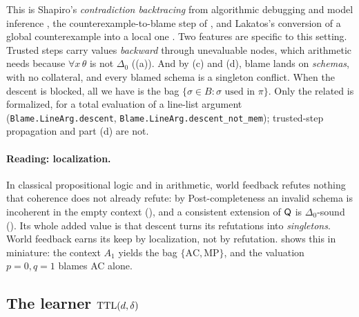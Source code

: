 This is Shapiro's \emph{contradiction backtracing} from algorithmic debugging and model inference \citep{shapiro1981inductive,shapiro1983algorithmic}, the counterexample-to-blame step of , and Lakatos's conversion of a global counterexample into a local one \citep{lakatos1976proofs}. Two features are specific to this setting. Trusted steps carry values \emph{backward} through unevaluable nodes, which arithmetic needs because $\forall x\,\theta$ is not $\Delta_0$ ((a)). And by (c) and (d), blame lands on \emph{schemas}, with no collateral, and every blamed schema is a singleton conflict. When the descent is blocked, all we have is the bag $\{\sigma\in B:\sigma\text{ used in }\pi\}$. Only the related  is formalized, for a total evaluation of a line-list argument (\texttt{Blame.LineArg.descent}, \texttt{Blame.LineArg.descent\_not\_mem}); trusted-step propagation and part (d) are not.

\paragraph{Reading: localization.} In classical propositional logic and in arithmetic, world feedback refutes nothing that coherence does not already refute: by Post-completeness an invalid schema is incoherent in the empty context (), and a consistent extension of $\mathsf{Q}$ is $\Delta_0$-sound (). Its whole added value is that descent turns its refutations into \emph{singletons}. World feedback earns its keep by localization, not by refutation.  shows this in miniature: the context $A_1$ yields the bag $\{\mathrm{AC},\mathrm{MP}\}$, and the valuation $p=0,q=1$ blames AC alone.

\subsection{The learner \texorpdfstring{$\mathrm{TTL}(d,\delta)$}{TTL(d,delta)}}\label{sec:twotier:learner}

